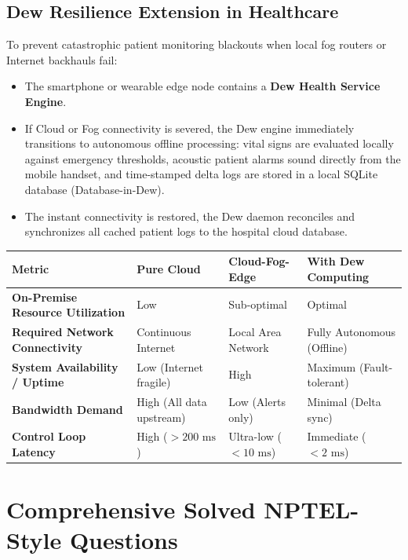 \subsection{Dew Resilience Extension in Healthcare}
To prevent catastrophic patient monitoring blackouts when local fog routers or Internet backhauls fail:
\begin{itemize}[leftmargin=*]
  \item The smartphone or wearable edge node contains a \textbf{Dew Health Service Engine}.
  \item If Cloud or Fog connectivity is severed, the Dew engine immediately transitions to autonomous offline processing: vital signs are evaluated locally against emergency thresholds, acoustic patient alarms sound directly from the mobile handset, and time-stamped delta logs are stored in a local SQLite database (Database-in-Dew).
  \item The instant connectivity is restored, the Dew daemon reconciles and synchronizes all cached patient logs to the hospital cloud database.
\end{itemize}

\begin{center}
\begin{tabularx}{\textwidth}{>{\bfseries}l X X X}
\toprule
Metric & Pure Cloud & Cloud-Fog-Edge & With Dew Computing\\
\midrule
On-Premise Resource Utilization & Low & Sub-optimal & Optimal\\
Required Network Connectivity & Continuous Internet & Local Area Network & Fully Autonomous (Offline)\\
System Availability / Uptime & Low (Internet fragile) & High & Maximum (Fault-tolerant)\\
Bandwidth Demand & High (All data upstream) & Low (Alerts only) & Minimal (Delta sync)\\
Control Loop Latency & High ($> 200\text{ ms}$) & Ultra-low ($< 10\text{ ms}$) & Immediate ($< 2\text{ ms}$)\\
\bottomrule
\end{tabularx}
\end{center}

\newpage
\section{Comprehensive Solved NPTEL-Style Questions}


